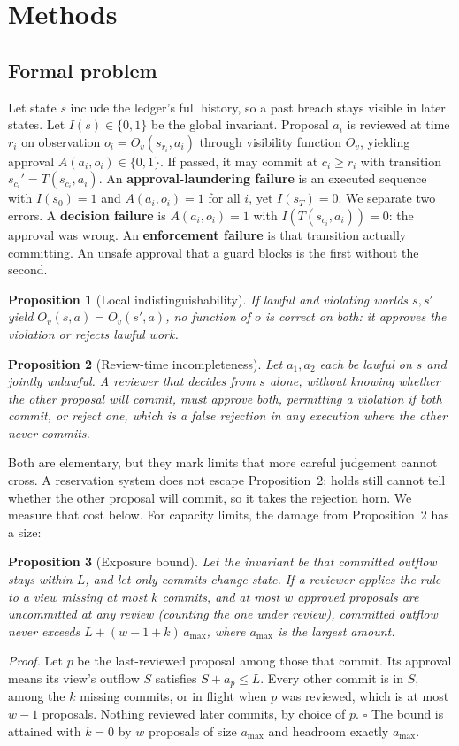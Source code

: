 \documentclass[10pt]{article}
\newtheorem{proposition}{Proposition}
\begin{document}
\section{Methods}
\subsection{Formal problem}
Let state $s$ include the ledger's full history, so a past breach stays visible in later states. Let $I(s)\in\{0,1\}$ be the global invariant. Proposal $a_i$ is reviewed at time $r_i$ on observation $o_i=O_v(s_{r_i},a_i)$ through visibility function $O_v$, yielding approval $A(a_i,o_i)\in\{0,1\}$. If passed, it may commit at $c_i\ge r_i$ with transition $s_{c_i}'=T(s_{c_i},a_i)$. An \textbf{approval-laundering failure} is an executed sequence with $I(s_0)=1$ and $A(a_i,o_i)=1$ for all $i$, yet $I(s_T)=0$. We separate two errors. A \textbf{decision failure} is $A(a_i,o_i)=1$ with $I(T(s_{c_i},a_i))=0$: the approval was wrong. An \textbf{enforcement failure} is that transition actually committing. An unsafe approval that a guard blocks is the first without the second.

\begin{proposition}[Local indistinguishability]
If lawful and violating worlds $s,s'$ yield $O_v(s,a)=O_v(s',a)$, no function of $o$ is correct on both: it approves the violation or rejects lawful work.
\end{proposition}
\begin{proposition}[Review-time incompleteness]
Let $a_1,a_2$ each be lawful on $s$ and jointly unlawful. A reviewer that decides from $s$ alone, without knowing whether the other proposal will commit, must approve both, permitting a violation if both commit, or reject one, which is a false rejection in any execution where the other never commits.
\end{proposition}
Both are elementary, but they mark limits that more careful judgement cannot cross. A reservation system does not escape Proposition~2: holds still cannot tell whether the other proposal will commit, so it takes the rejection horn. We measure that cost below. For capacity limits, the damage from Proposition~2 has a size:
\begin{proposition}[Exposure bound]\label{prop:bound}
Let the invariant be that committed outflow stays within $L$, and let only commits change state. If a reviewer applies the rule to a view missing at most $k$ commits, and at most $w$ approved proposals are uncommitted at any review (counting the one under review), committed outflow never exceeds $L+(w-1+k)\,a_{\max}$, where $a_{\max}$ is the largest amount.
\end{proposition}
\emph{Proof.} Let $p$ be the last-reviewed proposal among those that commit. Its approval means its view's outflow $S$ satisfies $S+a_p\le L$. Every other commit is in $S$, among the $k$ missing commits, or in flight when $p$ was reviewed, which is at most $w-1$ proposals. Nothing reviewed later commits, by choice of $p$. $\square$ The bound is attained with $k=0$ by $w$ proposals of size $a_{\max}$ and headroom exactly $a_{\max}$.
\end{document}
